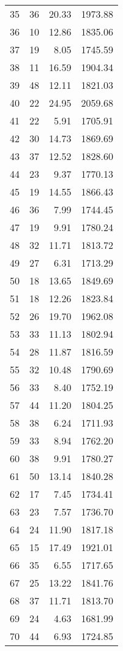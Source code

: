 \begin{appendix}
\begin{longtable}{rrrr}
35 & 36 & 20.33 & 1973.88 \\
36 & 10 & 12.86 & 1835.06 \\
37 & 19 & 8.05 & 1745.59 \\
38 & 11 & 16.59 & 1904.34 \\
39 & 48 & 12.11 & 1821.03 \\
40 & 22 & 24.95 & 2059.68 \\
41 & 22 & 5.91 & 1705.91 \\
42 & 30 & 14.73 & 1869.69 \\
43 & 37 & 12.52 & 1828.60 \\
44 & 23 & 9.37 & 1770.13 \\
45 & 19 & 14.55 & 1866.43 \\
46 & 36 & 7.99 & 1744.45 \\
47 & 19 & 9.91 & 1780.24 \\
48 & 32 & 11.71 & 1813.72 \\
49 & 27 & 6.31 & 1713.29 \\
50 & 18 & 13.65 & 1849.69 \\
51 & 18 & 12.26 & 1823.84 \\
52 & 26 & 19.70 & 1962.08 \\
53 & 33 & 11.13 & 1802.94 \\
54 & 28 & 11.87 & 1816.59 \\
55 & 32 & 10.48 & 1790.69 \\
56 & 33 & 8.40 & 1752.19 \\
57 & 44 & 11.20 & 1804.25 \\
58 & 38 & 6.24 & 1711.93 \\
59 & 33 & 8.94 & 1762.20 \\
60 & 38 & 9.91 & 1780.27 \\
61 & 50 & 13.14 & 1840.28 \\
62 & 17 & 7.45 & 1734.41 \\
63 & 23 & 7.57 & 1736.70 \\
64 & 24 & 11.90 & 1817.18 \\
65 & 15 & 17.49 & 1921.01 \\
66 & 35 & 6.55 & 1717.65 \\
67 & 25 & 13.22 & 1841.76 \\
68 & 37 & 11.71 & 1813.70 \\
69 & 24 & 4.63 & 1681.99 \\
70 & 44 & 6.93 & 1724.85 \\
\bottomrule
\end{longtable}


\end{appendix}
